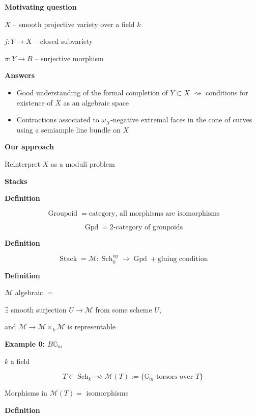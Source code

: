 \medskip\noindent
{\bf Motivating question}

$X$ -- smooth projective variety over a
field $k$

$j\colon Y\longrightarrow X$ -- closed
subvariety

$\pi\colon Y\longrightarrow B$ --
surjective morphism

\medskip\noindent
{\bf Answers}

\begin{itemize}
\item
[Artin '70] Good understanding of the
formal completion of $Y\subset X$
$\rightsquigarrow$ conditions for
existence of $\overline X$ as an
algebraic space

\item
[Koll\'ar, Mori '98] Contractions
associated to $\omega_X$-negative
extremal faces in the cone of curves using
a semiample line bundle on $X$
\end{itemize}

\medskip\noindent
{\bf Our approach}

Reinterpret $X$ as a moduli problem

\medskip\noindent
{\bf Stacks}

\medskip\noindent
{\bf Definition}

$$
\operatorname{Groupoid}
=
\text{category, all morphisms are
isomorphisms}
$$

$$
\operatorname{Gpd}
=
\text{2-category of groupoids}
$$

\medskip\noindent
{\bf Definition}

$$
\operatorname{Stack}
=
\mathcal M\colon
\operatorname{Sch}_k^{\mathrm{op}}
\longrightarrow
\operatorname{Gpd}
+
\text{gluing condition}
$$

\medskip\noindent
{\bf Definition}

$\mathcal M$ algebraic $=$

$\exists$ smooth surjection
$U\longrightarrow\mathcal M$ from some
scheme $U$,

and
$\mathcal M\longrightarrow
\mathcal M\times_k\mathcal M$
is representable

\medskip\noindent
{\bf Example 0: $B\mathbb G_m$}

$k$ a field

$$
T\in\operatorname{Sch}_k
\rightsquigarrow
\mathcal M(T)
:=
\{
\mathbb G_m\text{-torsors over }T
\}
$$

Morphisms in $\mathcal M(T)=$
isomorphisms

\medskip\noindent
{\bf Definition}

